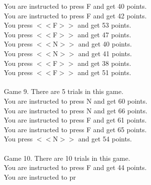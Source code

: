 \documentclass[pdflatex,sn-nature]{sn-jnl}%
\theoremstyle{thmstyleone}%
\theoremstyle{thmstyletwo}%
\theoremstyle{thmstylethree}%
\begin{document}
You are instructed to press F and get 40 points. $~$\\ 
You are instructed to press F and get 42 points. $~$\\ 
You press $<<$F$>>$ and get 53 points. $~$\\ 
You press $<<$F$>>$ and get 47 points. $~$\\ 
You press $<<$N$>>$ and get 40 points. $~$\\ 
You press $<<$N$>>$ and get 41 points. $~$\\ 
You press $<<$F$>>$ and get 38 points. $~$\\ 
You press $<<$F$>>$ and get 51 points. $~$\\ 
 $~$\\ 
Game 9. There are 5 trials in this game. $~$\\ 
You are instructed to press N and get 60 points. $~$\\ 
You are instructed to press N and get 66 points. $~$\\ 
You are instructed to press F and get 61 points. $~$\\ 
You are instructed to press F and get 65 points. $~$\\ 
You press $<<$N$>>$ and get 54 points. $~$\\ 
 $~$\\ 
Game 10. There are 10 trials in this game. $~$\\ 
You are instructed to press F and get 44 points. $~$\\ 
You are instructed to pr 
\end{document}
